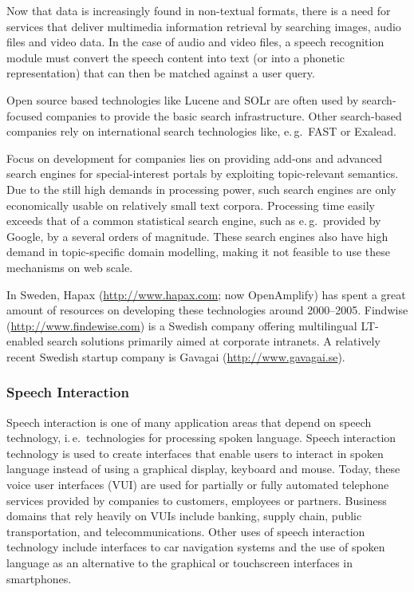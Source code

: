 \begin{multicols}{2}
Now that data is increasingly found in non-textual formats, there is a need for services that deliver multimedia information retrieval by searching images, audio files and video data. In the case of audio and video files, a speech recognition module must convert the speech content into text (or into a phonetic representation) that can then be matched against a user query.

Open source based technologies like Lucene and SOLr are often used by search-focused companies to provide the basic search infrastructure. Other search-based companies rely on international search technologies like, e.\,g.~FAST or Exalead.

Focus on development for companies lies on providing add-ons and advanced search engines for special-interest portals by exploiting topic-relevant semantics. Due to the still high demands in processing power, such search engines are only economically usable on relatively small text corpora. Processing time easily exceeds that of a common statistical search engine, such as e.\,g.~provided by Google, by a several orders of magnitude. These search engines also have high demand in topic-specific domain modelling, making it not feasible to use these mechanisms on web scale. 

In Sweden, Hapax (\url{http://www.hapax.com}; now Open\-Amplify) has
spent a great amount of resources on developing these technologies
around 2000–2005. Findwise (\url{http://www.findewise.com}) is a
Swedish company offering multilingual LT-enabled search solutions
primarily aimed at corporate intranets. A relatively recent Swedish
startup company is Gavagai (\url{http://www.gavagai.se}).

\subsubsection{Speech Interaction}

Speech interaction is one of many application areas that depend on speech technology, i.\,e.~technologies for processing spoken language. Speech interaction technology is used to create interfaces that enable users to interact in spoken language instead of using a graphical display, keyboard and mouse.  Today, these voice user interfaces (VUI) are used for partially or fully automated telephone services provided by companies to customers, employees or partners. Business domains that rely heavily on VUIs include banking, supply chain, public transportation, and telecommunications. Other uses of speech interaction technology include interfaces to car navigation systems and the use of spoken language as an alternative to the graphical or touchscreen interfaces in smartphones.


\end{multicols}
